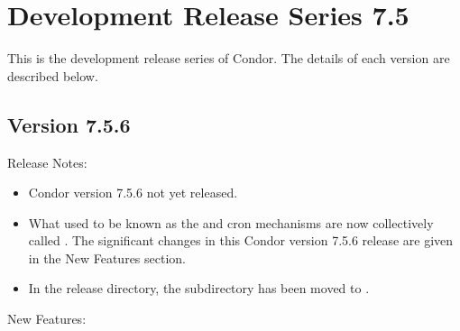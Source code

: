 
\section{\label{sec:History-7-5}Development Release Series 7.5}

This is the development release series of Condor.
The details of each version are described below.

\subsection*{\label{sec:New-7-5-6}Version 7.5.6}

\noindent Release Notes:

\begin{itemize}

\item Condor version 7.5.6 not yet released.

\item What used to be known as the  and  cron
  mechanisms are now collectively called .
  The significant changes in this Condor version 7.5.6 release are 
  given in the New Features section. 

\item In the release directory, the subdirectory  has
  been moved to .

\end{itemize}


\noindent New Features:

